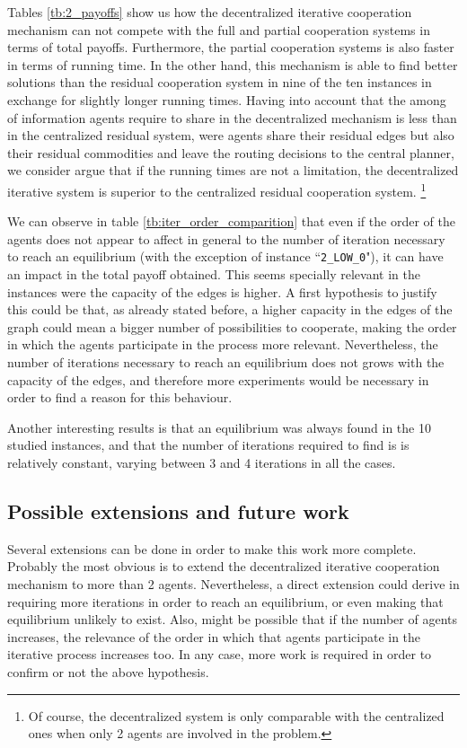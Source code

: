 \documentclass[review]{elsarticle}
\begin{document}
Tables \ref{tb:2_payoffs} show us how the decentralized iterative cooperation mechanism can not compete with the full and partial cooperation systems in terms of total payoffs. Furthermore, the partial cooperation systems is also faster in terms of running time. In the other hand, this mechanism is able to find better solutions than the residual cooperation system in nine of the ten instances in exchange for slightly longer running times. Having into account that the among of information agents require to share in the decentralized mechanism is less than in the centralized residual system, were agents share their residual edges but also their residual commodities and leave the routing decisions to the central planner, we consider argue that if the running times are not a limitation, the decentralized iterative system is superior to the centralized residual cooperation system. \footnote{Of course, the decentralized system is only comparable with the centralized ones when only 2 agents are involved in the problem.}

We can observe in table \ref{tb:iter_order_comparition} that even if the order of the agents does not appear to affect in general to the number of iteration necessary to reach an equilibrium (with the exception of instance ``\texttt{2\_LOW\_0}"), it can have an impact in the total payoff obtained. This seems specially relevant in the instances were the capacity of the edges is higher. A first hypothesis to justify this could be that, as already stated before, a higher capacity in the edges of the graph could mean a bigger number of possibilities to cooperate, making the order in which the agents participate in the process more relevant. Nevertheless, the number of iterations necessary to reach an equilibrium does not grows with the capacity of the edges, and therefore more experiments would be necessary in order to find a reason for this behaviour. 

Another interesting results is that an equilibrium was always found in the 10 studied instances, and that the number of iterations required to find is is relatively constant, varying between 3 and 4 iterations in all the cases.
\subsection{Possible extensions and future work}

Several extensions can be done in order to make this work more complete. Probably the most obvious is to extend the decentralized iterative cooperation mechanism to more than 2 agents. Nevertheless, a direct extension could derive in requiring more iterations in order to reach an equilibrium, or even making that equilibrium unlikely to exist. Also, might be possible that if the number of agents increases, the relevance of the order in which that agents participate in the iterative process increases too. In any case, more work is required in order to confirm or not the above hypothesis.
\end{document}

